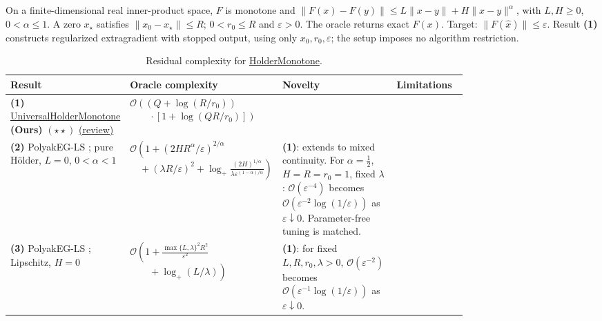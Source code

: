\begin{table}[tp]
\centering
\caption{Residual complexity for \href{https://github.com/k3nfalt/longtails/blob/main/LongTails/Setups/HolderMonotone.lean}{HolderMonotone}.}\label{tab:HolderMonotone}
\parbox{\linewidth}{\footnotesize On a finite-dimensional real inner-product space, $F$ is monotone and $\|F(x)-F(y)\|\le L\|x-y\|+H\|x-y\|^\alpha$, with $L,H\ge0$, $0<\alpha\le1$. A zero $x_\star$ satisfies $\|x_0-x_\star\|\le R$; $0<r_0\le R$ and $\varepsilon>0$. The oracle returns exact $F(x)$. Target: $\|F(\hat x)\|\le\varepsilon$. Result \textbf{(1)} constructs regularized extragradient with stopped output, using only $x_0,r_0,\varepsilon$; the setup imposes no algorithm restriction.}\par\smallskip
\begin{threeparttable}
\footnotesize
\setlength{\tabcolsep}{4pt}\renewcommand{\arraystretch}{1.25}
\begin{tabularx}{\linewidth}{@{}>{\raggedright\arraybackslash}p{0.20\linewidth}>{\raggedright\arraybackslash}p{0.32\linewidth}>{\raggedright\arraybackslash}p{0.25\linewidth}>{\raggedright\arraybackslash}X@{}}
\toprule
\textbf{Result} & \textbf{Oracle complexity} & \textbf{Novelty} & \textbf{Limitations} \\
\midrule
\textbf{(1)} \href{https://github.com/k3nfalt/longtails/blob/main/LongTails/Theorems/UniversalHolderMonotone.lean}{Universal\allowbreak Holder\allowbreak Monotone} \textbf{(Ours)} $(\star\star)$ \href{https://github.com/k3nfalt/longtails/blob/main/scripts/reviews/UniversalHolderMonotone.md}{(review)} & $\mathcal{O}\!\left((Q+\log(R/r_0))\right.$\newline $\left.\qquad\cdot[1+\log(QR/r_0)]\right)$ & & \\
\midrule[1.2pt]
\textbf{(2)} PolyakEG-LS \citep[Thm.~3.4, Prop.~3.5(b)]{holderYoon2026v1}; pure H\"older, $L=0$, $0<\alpha<1$ & $\mathcal{O}\!\left(1+(2HR^\alpha/\varepsilon)^{2/\alpha}\right.$\newline $\left.\quad +(\lambda R/\varepsilon)^2+\log_+\!\frac{(2H)^{1/\alpha}}{\lambda\varepsilon^{(1-\alpha)/\alpha}}\right)$ & \textbf{(1)}: extends to mixed continuity. For $\alpha=\tfrac12$, $H=R=r_0=1$, fixed $\lambda$: $\mathcal{O}(\varepsilon^{-4})$ becomes $\mathcal{O}(\varepsilon^{-2}\log(1/\varepsilon))$ as $\varepsilon\downarrow0$. Parameter-free tuning is matched. & \\
\midrule
\textbf{(3)} PolyakEG-LS \citep[Thm.~3.4, Prop.~3.5(a)]{holderYoon2026v1}; Lipschitz, $H=0$ & $\mathcal{O}\!\left(1+\frac{\max\{L,\lambda\}^2R^2}{\varepsilon^2}\right.$\newline $\left.\qquad+\log_+(L/\lambda)\right)$ & \textbf{(1)}: for fixed $L,R,r_0,\lambda>0$, $\mathcal{O}(\varepsilon^{-2})$ becomes $\mathcal{O}(\varepsilon^{-1}\log(1/\varepsilon))$ as $\varepsilon\downarrow0$. & \\

\end{tabularx}
\end{threeparttable}
\end{table}

